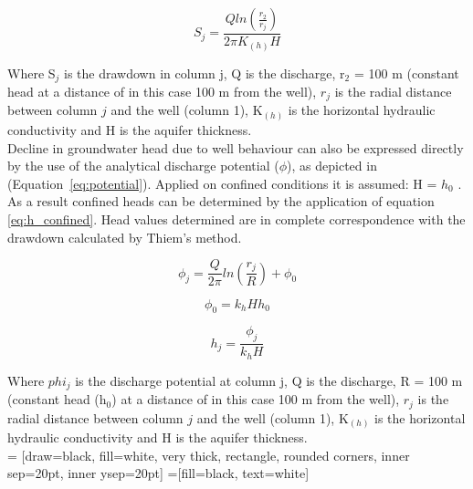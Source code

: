 \begin{equation}
 S_j = \frac{Q ln(\frac{r_{2}}{r_{j}})}{2\pi K_{(h)}H}
 \label{eq:thiem}
 \end{equation} 

Where S$_j$ is the drawdown in column j, Q is the discharge, r$_2$ = 100 m (constant head at a distance of in this case 100 m from the well), $r_j$ is the radial distance between column $j$ and the well (column 1), K$_{(h)}$ is the horizontal hydraulic conductivity and H is the aquifer thickness.\\

Decline in groundwater head due to well behaviour can also be expressed directly by the use of the analytical discharge potential ($\phi$), as depicted in (Equation~\ref{eq:potential}). Applied on confined conditions it is assumed: H = $h_0$ \citep{Bakker2011,Strack1989}. As a result confined heads can be determined by the application of equation \ref{eq:h_confined}. Head values determined are in complete correspondence with the drawdown calculated by Thiem's method. 

\begin{equation}
 \phi_j = \frac{Q}{2\pi} ln(\frac{r_j}{R}) + \phi_0
 \label{eq:potential}
\end{equation}  

\begin{equation}
 \phi_0 = k_{h}Hh_0
 \label{eq:pot_confined}
\end{equation}  

\begin{equation}
 h_j = \frac{\phi_j}{k_{h}H} 
 \label{eq:h_confined}
\end{equation}  

Where $phi_j$ is the discharge potential at column j, Q is the discharge, R = 100 m (constant head (h$_0$) at a distance of in this case 100 m from the well), $r_j$ is the radial distance between column $j$ and the well (column 1), K$_{(h)}$ is the horizontal hydraulic conductivity and H is the aquifer thickness.\\

 = [draw=black, fill=white, very thick,
    rectangle, rounded corners, inner sep=20pt, inner ysep=20pt]
 =[fill=black, text=white]


